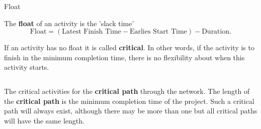 \documentclass[8pt]{beamer}
\begin{document}
\begin{frame}[shrink=10]{Float}
\begin{definition}
	The \textbf{float} of an activity is the 'slack time'
	\[
		\text{Float} = (\text{Latest Finish Time} - \text{Earlies Start Time}) - \text{Duration}
	.\] 
	
\end{definition}	

\begin{definition}
	If an activity has no float it is called \textbf{critical}. In other words, if the activity is to finish in the minimum completion time, there is no flexibility about when this activity starts.
	
\end{definition}

\begin{columns}
	\begin{column}{0.6\textwidth}
\centering
{}



		
	\end{column}
	\begin{column}{0.4\textwidth}
		
\centering
{}

	\end{column}
\end{columns}

\begin{definition}
	The critical activities for the \textbf{critical path} through the network. The length of the \textbf{critical path} is the minimum completion time of the project. Such a critical path will always exist, although there may be more than one but all critical paths will have the same length. 
	
\end{definition}

\end{frame}
\end{document}
